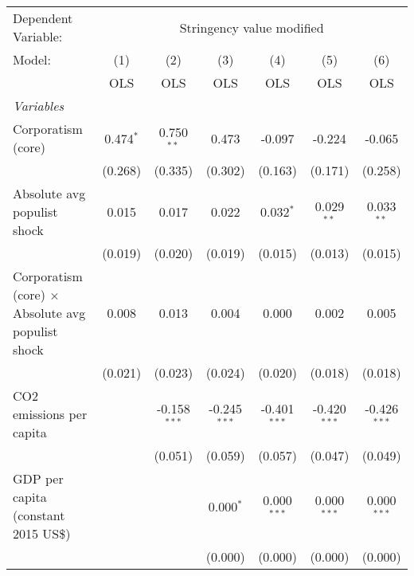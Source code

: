 
\begingroup
\centering
\begin{tabular}{lcccccc}
   \toprule
   Dependent Variable: & \multicolumn{6}{c}{Stringency value modified}\\
   Model:                                                   & (1)         & (2)            & (3)            & (4)            & (5)            & (6)\\  
                                                            &  OLS        & OLS            & OLS            & OLS            & OLS            & OLS\\  
   \midrule
   \emph{Variables}\\
   Corporatism (core)                                       & 0.474$^{*}$ & 0.750$^{**}$   & 0.473          & -0.097         & -0.224         & -0.065\\   
                                                            & (0.268)     & (0.335)        & (0.302)        & (0.163)        & (0.171)        & (0.258)\\   
   Absolute avg populist shock                              & 0.015       & 0.017          & 0.022          & 0.032$^{*}$    & 0.029$^{**}$   & 0.033$^{**}$\\   
                                                            & (0.019)     & (0.020)        & (0.019)        & (0.015)        & (0.013)        & (0.015)\\   
   Corporatism (core) $\times$ Absolute avg populist shock  & 0.008       & 0.013          & 0.004          & 0.000          & 0.002          & 0.005\\   
                                                            & (0.021)     & (0.023)        & (0.024)        & (0.020)        & (0.018)        & (0.018)\\   
   CO2 emissions per capita                                 &             & -0.158$^{***}$ & -0.245$^{***}$ & -0.401$^{***}$ & -0.420$^{***}$ & -0.426$^{***}$\\   
                                                            &             & (0.051)        & (0.059)        & (0.057)        & (0.047)        & (0.049)\\   
   GDP per capita (constant 2015 US\$)                      &             &                & 0.000$^{*}$    & 0.000$^{***}$  & 0.000$^{***}$  & 0.000$^{***}$\\   
                                                            &             &                & (0.000)        & (0.000)        & (0.000)        & (0.000)\\   

\end{tabular}
